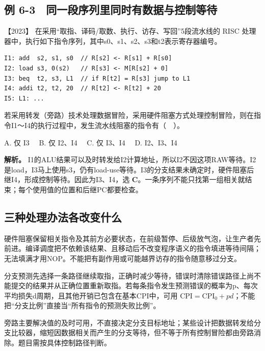 \subsection{例 6-3　同一段序列里同时有数据与控制等待}\label{co-ex6-3}

\noindent{}【2023】 在采用``取指、译码/取数、执行、访存、写回''5段流水线的 RISC 处理器中，执行如下指令序列，其中s0、s1、s2、s3和t2表示寄存器编号。

\par\medskip\noindent
\begin{minipage}{\linewidth}
\begin{verbatim}
I1: add  s2, s1, s0  // R[s2] <- R[s1] + R[s0]
I2: load s3, 0(s2)   // R[s3] <- M[R[s2] + 0]
I3: beq  t2, s3, L1  // if R[t2] = R[s3] jump to L1
I4: addi t2, t2, 20  // R[t2] <- R[t2] + 20
I5: L1: ...
\end{verbatim}
\end{minipage}\par\medskip

若采用转发（旁路）技术处理数据冒险，采用硬件阻塞方式处理控制冒险，则在指令I1～I4的执行过程中，发生流水线阻塞的指令有（　）。

A. 仅 I3　 B. 仅 I2、I4　 C. 仅 I3、I4　 D. I2、I3、I4


\textbf{解析。} I1的ALU结果可以及时转发给I2计算地址，所以I2不因这项RAW等待。I2是load，I3马上使用s3，仍有load-use等待。I3的分支结果未确定时，硬件阻塞后继I4，形成控制等待。因此为I3、I4，选 \textbf{C}。一条序列不能只找第一组相关就结束；每个使用值的位置和后继PC都要检查。

\subsection{三种处理办法各改变什么}\label{co-c06-h91}

硬件阻塞保留相关指令及其前方必要状态，在前级暂停、后级放气泡，让生产者先前进。编译调度把不依赖该结果、且移动后不改变程序语义的指令填进等待间隔；无法填满才用NOP。不能把有副作用或可能越界访存的指令随意移过分支。

分支预测先选择一条路径继续取指，正确时减少等待，错误时清除错误路径上尚不能提交的结果并从正确位置重新取指。若每条指令发生预测错误的概率为p、每次平均损失d周期，且其他开销已包含在基本CPI中，可用 \(\mathrm{CPI}=\mathrm{CPI}_{0}+pd\)；不能把``分支比例''直接当``所有指令的预测失败比例''。

旁路主要解决值的及时可用，不直接决定分支目标地址；某些设计把数据转发给分支比较器，缩短因数据相关而产生的分支等待，但不等于所有控制冒险都由旁路消除。题目需按具体控制路径判断。


